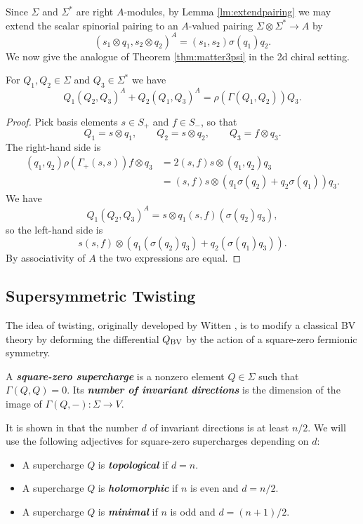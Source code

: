 \documentclass[10pt, oneside]{article}
\newcommand{\defterm}[1]{\textbf{\emph{#1}}}
\begin{document}
Since $\Sigma$ and $\Sigma^*$ are right $A$-modules, by Lemma \ref{lm:extendpairing} we may extend the scalar spinorial pairing to an $A$-valued pairing $\Sigma\otimes \Sigma^*\rightarrow A$ by
\[(s_1\otimes q_1, s_2\otimes q_2)^A = (s_1, s_2)\sigma(q_1) q_2.\]
We now give the analogue of Theorem \ref{thm:matter3psi} in the 2d chiral setting.

\begin{theorem}
For $Q_1, Q_2\in\Sigma$ and $Q_3\in\Sigma^*$ we have
\[Q_1(Q_2, Q_3)^A + Q_2(Q_1, Q_3)^A = \rho(\Gamma(Q_1, Q_2))Q_3.\]
\label{thm:2dmatter3psi}
\end{theorem}
\begin{proof}
Pick basis elements $s\in S_+$ and $f\in S_-$, so that
\[Q_1 = s\otimes q_1,\qquad Q_2 = s\otimes q_2,\qquad Q_3 = f\otimes q_3.\]
The right-hand side is
\begin{align*}
(q_1, q_2) \rho(\Gamma_+(s, s)) f\otimes q_3 &= 2(s, f) s\otimes (q_1, q_2) q_3 \\
&= (s, f) s\otimes (q_1\sigma(q_2) + q_2\sigma(q_1)) q_3.
\end{align*}
We have
\[Q_1(Q_2, Q_3)^A = s\otimes q_1 (s, f) (\sigma(q_2)q_3),\]
so the left-hand side is
\[s(s, f)\otimes (q_1(\sigma(q_2) q_3) + q_2(\sigma(q_1)q_3)).\]
By associativity of $A$ the two expressions are equal.
\end{proof}

\subsection{Supersymmetric Twisting}
The idea of twisting, originally developed by Witten \cite{WittenTQFT}, is to modify a classical BV theory by deforming the differential $Q_{\mathrm{BV}}$ by the action of a square-zero fermionic symmetry. 

\begin{definition}
A \defterm{square-zero supercharge} is a nonzero element $Q\in\Sigma$ such that $\Gamma(Q, Q)=0$. Its \defterm{number of invariant directions} is the dimension of the image of $\Gamma(Q, -)\colon \Sigma\rightarrow V$.
\end{definition}

It is shown in \cite[Proposition 3.25]{ElliottSafronov} that the number $d$ of invariant directions is at least $n/2$. We will use the following adjectives for square-zero supercharges depending on $d$:
\begin{itemize}
\item A supercharge $Q$ is \defterm{topological} if $d = n$.

\item A supercharge $Q$ is \defterm{holomorphic} if $n$ is even and $d=n/2$.

\item A supercharge $Q$ is \defterm{minimal} if $n$ is odd and $d=(n+1)/2$.
\end{itemize}
\end{document}
